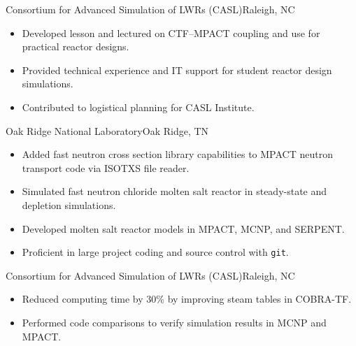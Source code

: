 \documentclass[letterpaper,12pt,nocolor,final]{moderncv}
\begin{document}
  {Consortium for Advanced Simulation of LWRs (CASL)}{Raleigh, NC}{}{
  \begin{itemize}
    \item Developed lesson and lectured on CTF--MPACT coupling and use for practical reactor designs.
    \item Provided technical experience and IT support for student reactor design simulations.
    \item Contributed to logistical planning for CASL Institute.
  \end{itemize}}

{Oak Ridge National Laboratory}{Oak Ridge, TN}{}{
  \begin{itemize}
    \item Added fast neutron cross section library capabilities to MPACT neutron transport code via ISOTXS file reader.
    \item Simulated fast neutron chloride molten salt reactor in steady-state and depletion simulations.
    \item Developed molten salt reactor models in MPACT, MCNP, and SERPENT.
    \item Proficient in large project coding and source control with 
      \texttt{git}.
  \end{itemize}}

{Consortium for Advanced Simulation of LWRs (CASL)}{Raleigh, NC}{}{
  \begin{itemize}
    \item Reduced computing time by 30\% by improving steam tables in COBRA-TF.
    \item Performed code comparisons to verify simulation results in MCNP and 
      MPACT.
  \end{itemize}}
\end{document}
